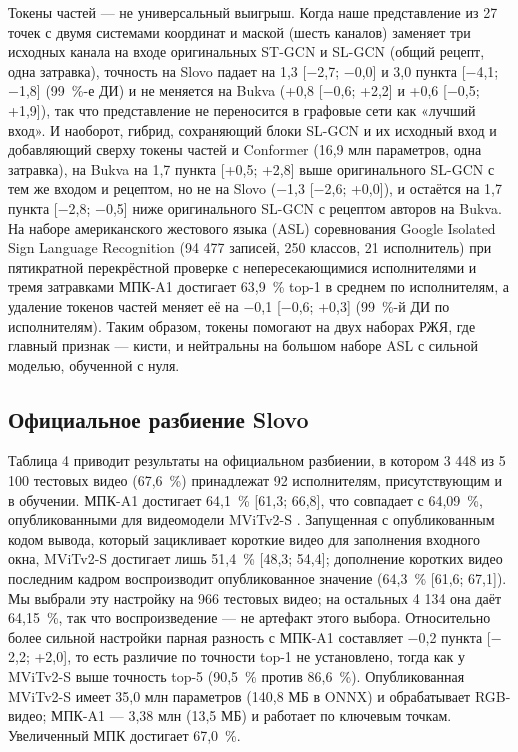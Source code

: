 \documentclass[a4paper,fleqn]{cas-dc}
\begin{document}
Токены частей --- не универсальный выигрыш. Когда наше представление из 27 точек с двумя системами координат и маской (шесть каналов) заменяет три исходных канала на входе оригинальных ST-GCN и SL-GCN (общий рецепт, одна затравка), точность на Slovo падает на 1,3 {[}$-$2,7; $-$0,0{]} и 3,0 пункта {[}$-$4,1; $-$1,8{]} (99~\%-е ДИ) и не меняется на Bukva (+0,8 {[}$-$0,6; +2,2{]} и +0,6 {[}$-$0,5; +1,9{]}), так что представление не переносится в графовые сети как «лучший вход». И наоборот, гибрид, сохраняющий блоки SL-GCN и их исходный вход и добавляющий сверху токены частей и Conformer (16,9 млн параметров, одна затравка), на Bukva на 1,7 пункта {[}+0,5; +2,8{]} выше оригинального SL-GCN с тем же входом и рецептом, но не на Slovo ($-$1,3 {[}$-$2,6; +0,0{]}), и остаётся на 1,7 пункта {[}$-$2,8; $-$0,5{]} ниже оригинального SL-GCN с рецептом авторов на Bukva. На наборе американского жестового языка (ASL) соревнования Google Isolated Sign Language Recognition \cite{2023_kaggle_gislr} (94 477 записей, 250 классов, 21 исполнитель) при пятикратной перекрёстной проверке с непересекающимися исполнителями и тремя затравками МПК-A1 достигает 63,9~\% top-1 в среднем по исполнителям, а удаление токенов частей меняет её на $-$0,1 {[}$-$0,6; +0,3{]} (99~\%-й ДИ по исполнителям). Таким образом, токены помогают на двух наборах РЖЯ, где главный признак --- кисти, и нейтральны на большом наборе ASL с сильной моделью, обученной с нуля.

\hypertarget{ux43eux444ux438ux446ux438ux430ux43bux44cux43dux43eux435-ux440ux430ux437ux431ux438ux435ux43dux438ux435-slovo}{%
\subsection{Официальное разбиение Slovo}\label{ux43eux444ux438ux446ux438ux430ux43bux44cux43dux43eux435-ux440ux430ux437ux431ux438ux435ux43dux438ux435-slovo}}

Таблица 4 приводит результаты на официальном разбиении, в котором 3 448 из 5 100 тестовых видео (67,6~\%) принадлежат 92 исполнителям, присутствующим и в обучении. МПК-A1 достигает 64,1~\% {[}61,3; 66,8{]}, что совпадает с 64,09~\%, опубликованными для видеомодели MViTv2-S \cite{2023_kapitanov_slovo}. Запущенная с опубликованным кодом вывода, который зацикливает короткие видео для заполнения входного окна, MViTv2-S достигает лишь 51,4~\% {[}48,3; 54,4{]}; дополнение коротких видео последним кадром воспроизводит опубликованное значение (64,3~\% {[}61,6; 67,1{]}). Мы выбрали эту настройку на 966 тестовых видео; на остальных 4 134 она даёт 64,15~\%, так что воспроизведение --- не артефакт этого выбора. Относительно более сильной настройки парная разность с МПК-A1 составляет $-$0,2 пункта {[}$-$2,2; +2,0{]}, то есть различие по точности top-1 не установлено, тогда как у MViTv2-S выше точность top-5 (90,5~\% против 86,6~\%). Опубликованная MViTv2-S имеет 35,0 млн параметров (140,8 МБ в ONNX) и обрабатывает RGB-видео; МПК-A1 --- 3,38 млн (13,5 МБ) и работает по ключевым точкам. Увеличенный МПК достигает 67,0~\%.
\end{document}
